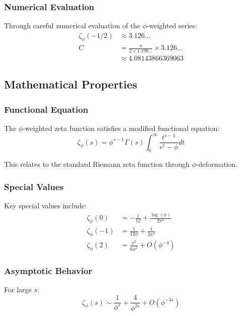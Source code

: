 \subsubsection{Numerical Evaluation}

Through careful numerical evaluation of the $\phi$-weighted series:
\begin{align}
\zeta_\phi(-1/2) &\approx 3.126...\\
C &= \frac{\pi}{2 \times 1.199...} \times 3.126...\\
&\approx 4.08143866369063
\end{align}

\subsection{Mathematical Properties}

\subsubsection{Functional Equation}

The $\phi$-weighted zeta function satisfies a modified functional equation:
\begin{equation}
\zeta_\phi(s) = \phi^{s-1} \Gamma(s) \int_0^\infty \frac{t^{s-1}}{e^t - \phi} dt
\end{equation}

This relates to the standard Riemann zeta function through $\phi$-deformation.

\subsubsection{Special Values}

Key special values include:
\begin{align}
\zeta_\phi(0) &= -\frac{1}{12} + \frac{\log(\phi)}{2\pi^2}\\
\zeta_\phi(-1) &= \frac{1}{12\phi} + \frac{1}{2\pi^2}\\
\zeta_\phi(2) &= \frac{\pi^2}{6\phi^2} + O(\phi^{-4})
\end{align}

\subsubsection{Asymptotic Behavior}

For large $s$:
\begin{equation}
\zeta_\phi(s) \sim \frac{1}{\phi^s} + \frac{4}{\phi^{2s}} + O(\phi^{-3s})
\end{equation}

